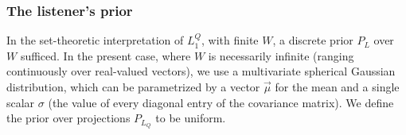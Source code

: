 \documentclass[OpenMind]{stjour}
\begin{document}
		


	





		
	







	\subsubsection{The listener's prior} 

		In the set-theoretic interpretation of $L_1^Q$, with finite $W$, a discrete prior $P_L$ over $W$ sufficed. In the present case, where $W$ is necessarily infinite (ranging continuously over real-valued vectors), we use a multivariate spherical Gaussian distribution, which can be parametrized by a vector $\overrightarrow{\mu}$ for the mean and a single scalar $\sigma$ (the value of every diagonal entry of the covariance matrix). We define the prior over projections $P_{L_Q}$ to be uniform.
\end{document}
